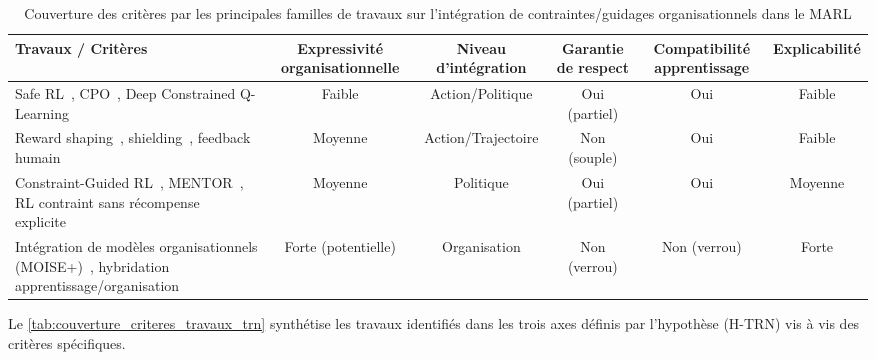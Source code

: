 \begin{table}[h!]
  \centering
  \caption{Couverture des critères par les principales familles de travaux sur l’intégration de contraintes/guidages organisationnels dans le MARL}
  \label{tab:couverture_criteres_travaux_trn}
  \begin{tabular}{|p{5.5cm}|c|c|c|c|c|}
    \hline
    \textbf{Travaux / Critères}                                                                                                                              & \textbf{Expressivité organisationnelle} & \textbf{Niveau d’intégration} & \textbf{Garantie de respect} & \textbf{Compatibilité apprentissage} & \textbf{Explicabilité} \\
    \hline
    Safe RL~\cite{garcia2015comprehensive}, CPO~\cite{achiam2017constrained}, Deep Constrained Q-Learning~\cite{kalweit2020deep}                             & Faible                                  & Action/Politique              & Oui (partiel)                & Oui                                  & Faible                 \\
    \hline
    Reward shaping~\cite{ng1999policy}, shielding~\cite{amodei2016concrete}, feedback humain~\cite{warnell2018deep,zhou2025mentor}                           & Moyenne                                 & Action/Trajectoire            & Non (souple)                 & Oui                                  & Faible                 \\
    \hline
    Constraint-Guided RL~\cite{spieker2021constraint}, MENTOR~\cite{zhou2025mentor}, RL contraint sans récompense explicite~\cite{miryoosefi2022}            & Moyenne                                 & Politique                     & Oui (partiel)                & Oui                                  & Moyenne                \\
    \hline
    Intégration de modèles organisationnels (MOISE+)~\cite{hubner2007using}, hybridation apprentissage/organisation~\cite{bordini2006jade,chernova2014robot} & Forte (potentielle)                     & Organisation                  & Non (verrou)                 & Non (verrou)                         & Forte                  \\
    \hline
  \end{tabular}
\end{table}

Le \autoref{tab:couverture_criteres_travaux_trn} synthétise les travaux identifiés dans les trois axes définis par l’hypothèse (H-TRN) vis à vis des critères spécifiques.

